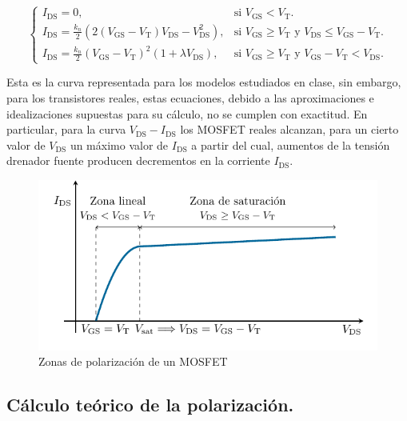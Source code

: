 \documentclass[11pt,a4paper]{article}
\begin{document}
    \begin{equation}
			\begin{cases}
			I_{\mathrm{DS}} = 0, & \mbox{si }V_{\mathrm{GS}}< V_{\mathrm{T}}.\\
			I_{\mathrm{DS}} = \frac{k_n}{2}\left(2\left(V_{\mathrm{GS}}-V_{\mathrm{T}}\right)V_{\mathrm{DS}}-V_{\mathrm{DS}}^2\right), & \mbox{si } V_{\mathrm{GS}}\geq V_{\mathrm{T}} \mbox{ y }V_{\mathrm{DS}}\leq V_{\mathrm{GS}}-V_{\mathrm{T}}.\\
			I_{\mathrm{DS}} = \frac{k_n}{2}\left(V_{\mathrm{GS}}-V_{\mathrm{T}}\right)^2\left(1+\lambda V_{\mathrm{DS}}\right), & \mbox{si } V_{\mathrm{GS}}\geq V_{\mathrm{T}} \mbox{ y } V_{\mathrm{GS}}-V_{\mathrm{T}}< V_{\mathrm{DS}}.
			\end{cases}
			\label{eq_mosfet}
		\end{equation}

		Esta es la curva representada para los modelos estudiados en clase, sin embargo, para los transistores reales, estas ecuaciones, debido a las aproximaciones e idealizaciones supuestas para su cálculo, no se cumplen con exactitud. En particular, para la curva $V_\mathrm{DS}-I_\mathrm{DS}$ los MOSFET reales alcanzan, para un cierto valor de $V_\mathrm{DS}$ un máximo valor de $I_\mathrm{DS}$ a partir del cual, aumentos de la tensión drenador fuente producen decrementos en la corriente $I_\mathrm{DS}$.

    \begin{figure}[!hbt]
      \centering
      \includegraphics[width=0.8\columnwidth]{figuras/mosfet-curva}
      \caption{Zonas de polarización de un MOSFET}
      \label{zonas_mosfet}
    \end{figure}



	\subsection{Cálculo teórico de la polarización.}
\end{document}
